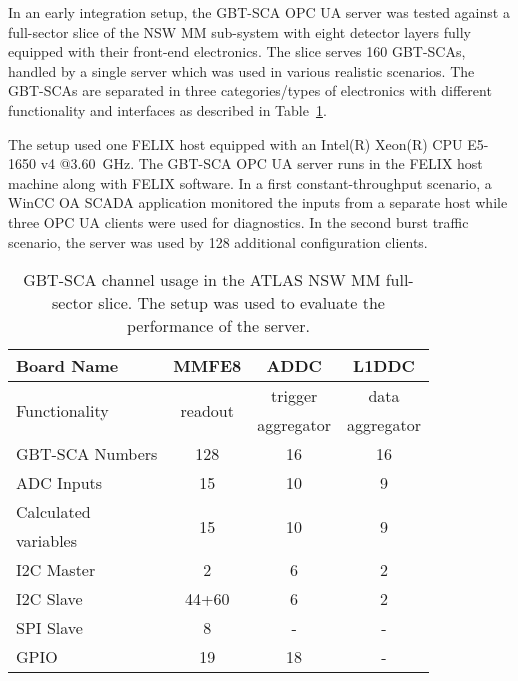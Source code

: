 \documentclass[cernpreprint, atlasdraft=false, UKenglish,british,orcidlogo, texmf, orcidlogo]{atlasdoc}
\begin{document}
In an early integration setup, the \gls{GBT-SCA} \gls{OPC UA} server was tested against a full-sector slice of the \gls{NSW} \gls{MM} sub-system with eight detector layers fully equipped with their front-end electronics. The slice serves \num{160} \glspl{GBT-SCA}, handled by a single server which was used in various realistic scenarios. The  \glspl{GBT-SCA} are separated in three categories/types of electronics with different functionality and interfaces as described in Table~\ref{tab:sca-setup}.
 
The setup used one \gls{FELIX} host equipped with an Intel(R) Xeon(R) CPU E5-1650 v4 @\SI{3.60}{\GHz}. The \gls{GBT-SCA} \gls{OPC UA} server runs in the  \gls{FELIX} host machine along with  \gls{FELIX} software. In a first constant-throughput scenario, a \gls{WinCC OA} \gls{SCADA} application monitored the \analog inputs from a separate host while three \gls{OPC UA}  clients were used for diagnostics. In the second burst traffic scenario, the server was used by 128 additional configuration clients.
 
\begin{table}[!htp]
\centering
\caption{ \gls{GBT-SCA} channel usage in the ATLAS  \gls{NSW} \gls{MM} full-sector slice. The setup was used to evaluate the performance of the server.}
\begin{tabular}{lccc}
\toprule
\textbf{Board Name}				& \textbf{\gls{MMFE8}}	& \textbf{\gls{ADDC}}						& \textbf{\gls{L1DDC}}\\
\midrule
\multirow{ 2}{*}{Functionality}	&\multirow{ 2}{*}{readout}		&trigger					&data \\
&											&aggregator				&aggregator\\
 
\gls{GBT-SCA} Numbers					&128								&16								&16\\
 
\gls{ADC} Inputs				&15								&10								&9\\
 
Calculated 				&\multirow{ 2}{*}{15}		&\multirow{ 2}{*}{10}		&\multirow{ 2}{*}{9}\\
variables					&									&									&	\\
 
\gls{I2C} Master 				&2								&6								&2\\
 
\gls{I2C} Slave 					&44+60						&6								&2\\
 
\gls{SPI} Slave					&8								&-									&-\\
 
\gls{GPIO}			&19								&18								&-\\
\bottomrule
\end{tabular}
 
\label{tab:sca-setup}
\end{table}
 
\end{document}
